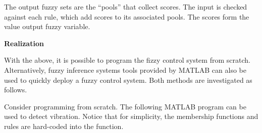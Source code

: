 The output fuzzy sets are the ``pools'' that collect scores. The input is checked against each rule, which add scores to its associated pools. The scores form the value output fuzzy variable.

\vspace{0.1in}
\noindent \textbf{Realization}
\vspace{0.1in}

With the above, it is possible to program the fizzy control system from scratch. Alternatively, fuzzy inference systems tools provided by MATLAB can also be used to quickly deploy a fuzzy control system. Both methods are investigated as follows.

Consider programming from scratch. The following MATLAB program can be used to detect vibration. Notice that for simplicity, the membership functions and rules are hard-coded into the function.
